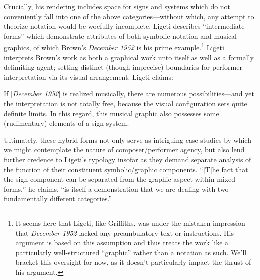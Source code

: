  Crucially, his rendering includes space for signs and systems which do not conveniently fall into one of the above categories---without which, any attempt to theorize notation would be woefully incomplete. Ligeti describes ``intermediate forms'' which demonstrate attributes of both symbolic notation and musical graphics, of which Brown's \textit{December 1952} is his prime example.\footnote{It seems here that Ligeti, like Griffiths, was under the mistaken impression that \textit{December 1952} lacked any preambulatory text or instructions. His argument is based on this assumption and thus treats the work like a particularly well-structured ``graphic'' rather than a notation as such. We'll bracket this oversight for now, as it doesn't particularly impact the thrust of his argument.} Ligeti interprets Brown's work as both a graphical work unto itself as well as a formally delimiting agent; setting distinct (though imprecise) boundaries for performer interpretation via its visual arrangement. Ligeti claims:

\begin{smallquote}
    If [\textit{December 1952}] is realized musically, there are numerous possibilities---and yet the interpretation is not totally free, because the visual configuration sets quite definite limits. In this regard, this musical graphic also possesses some (rudimentary) elements of a sign system.\autocite[pg. 177 in Ernst et al., 1965.]{Ligeti_forthcoming}
\end{smallquote}

\noindent Ultimately, these hybrid forms not only serve as intriguing case-studies by which we might contemplate the nature of composer/performer agency, but also lend further credence to Ligeti's typology insofar as they demand separate analysis of the function of their constituent symbolic/graphic components. ``[T]he fact that the sign component can be separated from the graphic aspect within mixed forms,'' he claims, ``is itself a demonstration that we are dealing with two fundamentally different categories.''\autocite[pg. 177 in Ernst et al., 1965.]{Ligeti_forthcoming}


